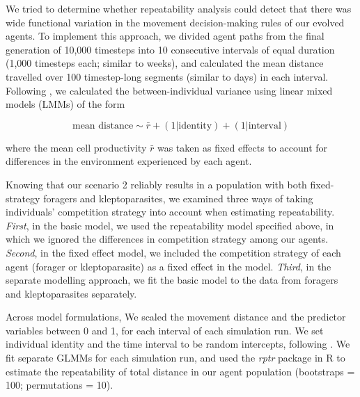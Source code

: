 We tried to determine whether repeatability analysis could detect that there was wide functional variation in the movement decision-making rules of our evolved agents.
To implement this approach, we divided agent paths from the final generation of 10,000 timesteps into 10 consecutive intervals of equal duration (1,000 timesteps each; similar to weeks), and calculated the mean distance travelled over 100 timestep-long segments (similar to days) in each interval.
Following \cite{hertel2019}, we calculated the between-individual variance using linear mixed models (LMMs) of the form
\begin{linenomath*}
    \begin{equation}
        \text{mean distance} \sim \bar{r} + (1 | \text{identity}) + (1 | \text{interval})
    \end{equation}
\end{linenomath*}
where the mean cell productivity $\bar{r}$ was taken as fixed effects to account for differences in the environment experienced by each agent.

Knowing that our scenario 2 reliably results in a population with both fixed-strategy foragers and kleptoparasites, we examined three ways of taking individuals' competition strategy into account when estimating repeatability.
\textit{First}, in the basic model, we used the repeatability model specified above, in which we ignored the differences in competition strategy among our agents.
\textit{Second}, in the fixed effect model, we included the competition strategy of each agent (forager or kleptoparasite) as a fixed effect in the model.
\textit{Third}, in the separate modelling approach, we fit the basic model to the data from foragers and kleptoparasites separately.

Across model formulations, We scaled the movement distance and the predictor variables between 0 and 1, for each interval of each simulation run.
We set individual identity and the time interval to be random intercepts, following \citep{hertel2020}.
We fit separate GLMMs for each simulation run, and used the \textit{rptr} package in R \citep{nakagawa2010} to estimate the repeatability of total distance in our agent population (bootstraps = 100; permutations = 10).

